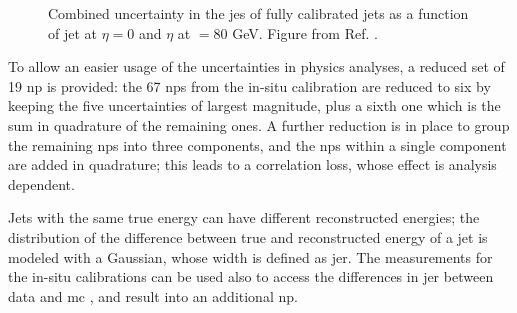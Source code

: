 \begin{figure}[h]
\begin{center}
\end{center}
 \caption{Combined uncertainty in the \gls{jes} of fully calibrated jets as a function of   
 jet \pt at $\eta = 0$ and  $\eta$ at \pt$ = 80$ GeV. Figure from Ref. \cite{PhysRevD.96.072002}.}
  \label{fig:obj:jessyst}
\end{figure}

To allow an easier usage of the uncertainties in physics analyses, a reduced set of 19 \gls{np} is provided: 
the 67 \glspl{np} from the in-situ calibration are reduced to six by keeping the five uncertainties of largest magnitude, 
plus a sixth one which is the sum in quadrature of the remaining ones. 
A further reduction is in place to group the remaining \glspl{np} into three components, 
and the \glspl{np} within a single component are added in quadrature; this leads to a correlation loss, whose effect is analysis dependent. 

Jets with the same true energy can have different reconstructed energies; the distribution of the difference between true and reconstructed energy of a jet is modeled with a Gaussian, whose width is defined as \gls{jer}. The measurements for the in-situ calibrations can be used also to access the differences in \gls{jer} between data and \gls{mc} \cite{ATLAS-CONF-2015-057,ATLAS-CONF-2015-017}, and result into an additional \gls{np}.

